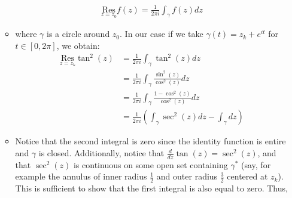 \documentclass[10pt,a4paper]{article}
\theoremstyle{definition}
\begin{document}
\begin{enumerate}[label = (\alph*)]
\begin{itemize}
	\begin{align}
	\underset{z = z_0}{\text{Res}}f(z) = \frac{1}{2\pi i} \int_{\gamma} f(z) dz
	\end{align}
	\item where $\gamma$ is a circle around $z_0$. In our case if we take $\gamma(t) = z_k + e^{it}$ for $t \in [0, 2 \pi]$, we obtain:
	\begin{align*}
	\underset{z = z_k}{\text{Res}}\tan^2(z) &= \frac{1}{2\pi i}\int_{\gamma} \tan^2(z) dz\\
	&= \frac{1}{2\pi i} \int_{\gamma} \frac{\sin^2(z)}{\cos^2(z)} dz\\
	&= \frac{1}{2\pi i} \int_{\gamma} \frac{1 - \cos^2(z)}{\cos^2(z)} dz\\
	&= \frac{1}{2\pi i}\left( \int_{\gamma} \sec^2(z) dz - \int_{\gamma} dz \right)
	\end{align*}
	\item Notice that the second integral is zero since the identity function is entire and $\gamma$ is closed. Additionally, notice that $\frac{d}{dz}\tan(z) = \sec^2(z)$, and that $\sec^2(z)$ is continuous on some open set containing $\gamma^*$ (say, for example the annulus of inner radius $\frac{1}{2}$ and outer radius $\frac{3}{2}$ centered at $z_k$). This is sufficient to show that the first integral is also equal to zero. Thus, 
	\end{itemize}
\end{enumerate}
\end{document}
